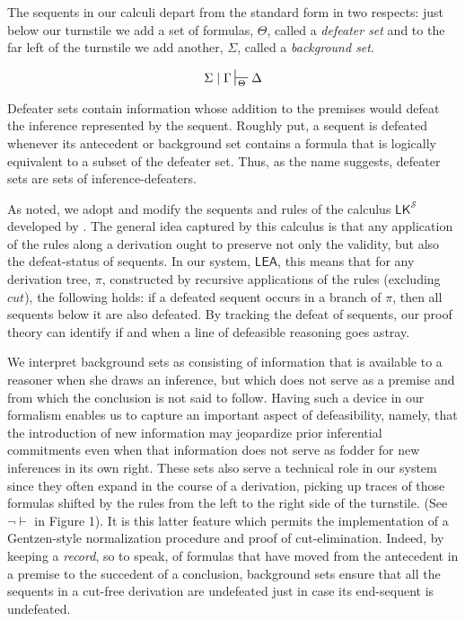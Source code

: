 \documentclass{article}
\newcounter{fncntr}
\newcommand{\fnmark}[1]{\refstepcounter{fncntr}\label{#1}\footnotemark[\getrefnumber{#1}]}
\theoremstyle{definition}
\theoremstyle{definition}
\theoremstyle{definition}
\theoremstyle{definition}
\theoremstyle{remark}
\theoremstyle{definition}
\theoremstyle{definition}
\begin{document}
The sequents in our calculi depart from the standard form in two respects: just below our turnstile we add a set of formulas, $\Theta $, called a \textit{defeater set} and to the far left of the turnstile we add another, $\Sigma $, called a \textit{background set}.

$$ \Sigma\mid\Gamma\sststile{\Theta}{}\Delta $$

Defeater sets contain information whose addition to the premises would defeat the inference represented by the sequent.  Roughly put, a sequent is defeated whenever its antecedent or background set contains a formula that is logically equivalent to a subset of the defeater set. Thus, as the name suggests, defeater sets are sets of inference-defeaters.  

As noted, we adopt and modify the sequents and rules of the calculus $\mathsf{LK}^\mathcal{S} $ developed by \textcite{Piazza2015}. The general idea captured by this calculus is that any application of the rules along a derivation ought to preserve not only the validity, but also the defeat-status of sequents. In our system, $ \mathsf{LEA} $, this means that for any derivation tree, $\pi$, constructed by recursive applications of the rules (excluding $cut$), the following holds: if a defeated sequent occurs in a branch of $\pi$, then all sequents below it are also defeated. By tracking the defeat of sequents, our proof theory can identify if and when a line of defeasible reasoning goes astray. 




We interpret background sets as consisting of information that is available to a reasoner when she draws an inference, but which does not serve as a premise and from which the conclusion is not said to follow. Having such a device in our formalism enables us to capture an important aspect of defeasibility, namely, that the introduction of new information may jeopardize prior inferential commitments even when that information does not serve as fodder for new inferences in its own right. These sets also serve a technical role in our system since they often expand in the course of a derivation, picking up traces of those formulas shifted by the rules from the left to the right side of the turnstile. (See $\neg\vdash$ in Figure 1). It is this latter feature which permits the implementation of a Gentzen-style normalization procedure and proof of cut-elimination. Indeed, by keeping a \textit{record}, so to speak, of formulas that have moved from the antecedent in a premise to the succedent of a conclusion, background sets ensure that all the sequents in a cut-free derivation are undefeated just in case its end-sequent is undefeated.\fnmark{Piazza-Repos} 
\end{document}
